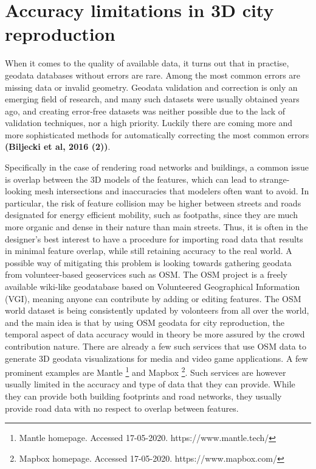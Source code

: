 \documentclass{kththesis}
\begin{document}
\section{Accuracy limitations in 3D city reproduction}

When it comes to the quality of available data, it turns out that in practise, geodata databases without errors are rare.
Among the most common errors are missing data or invalid geometry.
Geodata validation and correction is only an emerging field of research, and many such datasets were usually obtained years ago, and creating error-free datasets was neither possible due to the lack of validation techniques, nor a high priority.
Luckily there are coming more and more sophisticated methods for automatically correcting the most common errors
\textbf{(Biljecki et al, 2016 (2))}.

Specifically in the case of rendering road networks and buildings, a common issue is overlap between the 3D models of the features, which can lead to strange-looking mesh intersections and inaccuracies that modelers often want to avoid.
In particular, the risk of feature collision may be higher between streets and roads designated for energy efficient mobility, such as footpaths, since they are much more organic and dense in their nature than main streets.
Thus, it is often in the designer's best interest to have a procedure for importing road data that results in minimal feature overlap, while still retaining accuracy to the real world.
A possible way of mitigating this problem is looking towards gathering geodata from volunteer-based geoservices such as OSM.
The OSM project is a freely available wiki-like geodatabase based on Volunteered Geographical Information (VGI), meaning anyone can contribute by adding or editing features.
The OSM world dataset is being consistently updated by volonteers from all over the world, and the main idea is that by using OSM geodata for city reproduction, the temporal aspect of data accuracy would in theory be more assured by the crowd contribution nature.
There are already a few such services that use OSM data to generate 3D geodata visualizations for media and video game applications.
A few prominent examples are Mantle
\footnote{Mantle homepage. Accessed 17-05-2020. https://www.mantle.tech/}
and Mapbox
\footnote{Mapbox homepage. Accessed 17-05-2020. https://www.mapbox.com/}.
Such services are however usually limited in the accuracy and type of data that they can provide.
While they can provide both building footprints and road networks, they usually provide road data with no respect to overlap between features.
\end{document}
